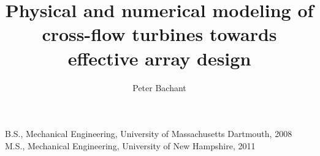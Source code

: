 
\title{Physical and numerical modeling of cross-flow turbines towards effective
array design}

\author{Peter Bachant}

\prevdegrees
{
    B.S., Mechanical Engineering, University of Massachusetts Dartmouth, 2008
    \\
    M.S., Mechanical Engineering, University of New Hampshire, 2011
}





\thesisdate{\today}

\frontmatter

\maketitle
